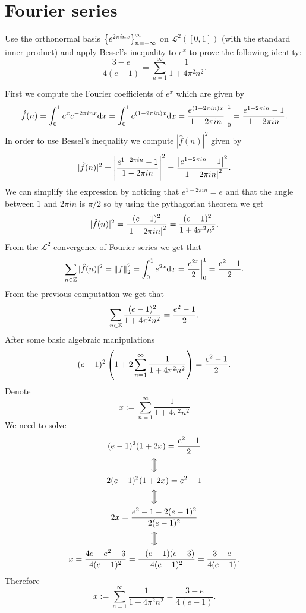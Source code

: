 \documentclass[11pt,a4paper]{article}
\begin{document}
\newpage

\section{Fourier series}

\begin{exercise}
  Use the orthonormal basis $\left\{e^{2\pi i n x}\right\}_{n=-\infty}^{\infty}$
  on $\mathcal L^2([0,1])$ (with the standard inner product) and apply Bessel's
  inequality to $e^x$ to prove the following identity:
  \[
    \frac{3 - e}{4(e - 1)} =
    \sum_{n=1}^{\infty} \frac{1}{1 + 4 \pi^2 n^2}.
  \]
\end{exercise}
\begin{solution}
  First we compute the Fourier coefficients of $e^x$ which are given by
  \[
    \hat f(n) =
    \int_{0}^{1} e^x e^{-2\pi i n x} \dx =
    \int_{0}^{1} e^{(1 - 2\pi i n) x} \dx =
    \frac{e^{(1 - 2\pi i n) x}}{1 - 2\pi i n} \biggr\vert^{1}_{0} =
    \frac{e^{1 - 2\pi i n} - 1}{1 - 2\pi i n}.
  \]
  In order to use Bessel's inequality we compute $|\hat f(n)|^2$ given by
  \[
    |\hat f(n)|^2 =
    \left\lvert\frac{e^{1 - 2\pi i n} - 1}{1 - 2\pi i n}\right\rvert^2 =
    \frac{\left\lvert e^{1 - 2\pi i n} - 1\right\rvert^2}{\left\lvert1 - 2\pi i n\right\rvert^2}.
  \]
  We can simplify the expression by noticing that $e^{1 - 2\pi i n} = e$
  and that the angle between $1$ and $2 \pi i n$ is $\pi/2$ so
  by using the pythagorian theorem we get
  \[
    |\hat f(n)|^2 =
    \frac{(e - 1)^2}{\left\lvert1 - 2\pi i n\right\rvert^2} =
    \frac{(e - 1)^2}{1 + 4\pi^2 n^2}.
  \]
  From the $\mathcal L^2$ convergence of Fourier series we get that
  \[
    \sum_{n \in \Z} |\hat f(n)|^2 =
    \norm{f}_2^2 =
    \int_{0}^{1} e^{2x} \dx =
    \frac{e^{2x}}{2} \biggr\vert^{1}_{0} =
    \frac{e^2 - 1}{2}.
  \]
  From the previous computation we get that
  \[
    \sum_{n \in \mathbb{Z}} \frac{(e - 1)^2}{1 + 4\pi^2 n^2} =
    \frac{e^2 - 1}{2}.
  \]
  After some basic algebraic manipulations
  \[
    (e - 1)^2 \del{1 + 2 \sum_{n=1}^{\infty} \frac{1}{1 + 4\pi^2 n^2}} =
    \frac{e^2 - 1}{2}.
  \]
  Denote
  \[
    x := \sum_{n=1}^{\infty} \frac{1}{1 + 4\pi^2 n^2}
  \]
  We need to solve
  \begin{gather*}
    (e - 1)^2 (1 + 2x) = \frac{e^2 - 1}{2} \\
    \Big\Updownarrow \\
    2 (e - 1)^2 (1 + 2x) = e^2 - 1 \\
    \Big\Updownarrow \\
    2x = \frac{e^2 - 1 - 2(e - 1)^2}{2 (e - 1)^2}  \\
    \Big\Updownarrow \\
    x =
    \frac{4 e - e^2 - 3}{4 (e - 1)^2} =
    \frac{- (e - 1) (e - 3)}{4 (e - 1)^2} =
    \frac{3 - e}{4 (e - 1)}.
  \end{gather*}
  Therefore
  \[
    x := \sum_{n=1}^{\infty} \frac{1}{1 + 4\pi^2 n^2} =
    \frac{3 - e}{4 (e - 1)}.
  \]
\end{solution}
\end{document}
